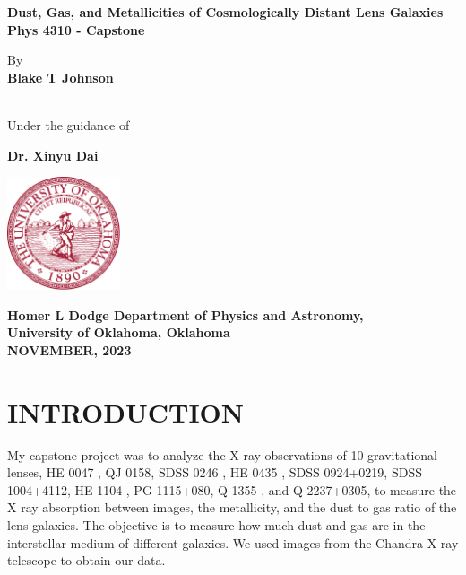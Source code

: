 \documentclass[12pt]{report}
\date{}
\begin{document}
\doublespacing
\thispagestyle{empty}
\vspace*{0.3cm}
\begin{center}
\textbf{ \Large
Dust, Gas, and Metallicities of Cosmologically Distant Lens
Galaxies \\
}
\vspace*{2cm}
\textbf{Phys 4310 - Capstone} 
\vspace*{2cm}

By \\
\vspace*{1cm}
\textbf{Blake T Johnson}

\textbf{}
\vspace*{2cm} \\
Under the guidance of

\textbf{Dr. Xinyu Dai}
\vspace*{2cm}
\begin{center}
\includegraphics[max width=0.25\textwidth]{Images/University_of_Oklahoma_seal.svg.png}
\end{center}

\textbf{Homer L Dodge Department of Physics and Astronomy, \\ University of Oklahoma, Oklahoma \\ NOVEMBER, 2023}
\end{center}



\newpage
\tableofcontents






\newpage
{}


\chapter{INTRODUCTION}

My capstone project was to analyze the X \textemdash ray observations of 10 gravitational lenses, HE 0047 , QJ 0158, SDSS 0246 , HE 0435 ,
SDSS 0924+0219, SDSS 1004+4112, HE 1104 , PG 1115+080,
Q 1355 , and Q 2237+0305, to measure the X \textemdash ray absorption
between images, the metallicity, and the dust \textemdash to \textemdash gas ratio of the lens galaxies. The objective is to measure how much dust and gas are in the interstellar medium of different galaxies. We used images from the Chandra X \textemdash ray telescope to obtain our data.\\
\end{document}

